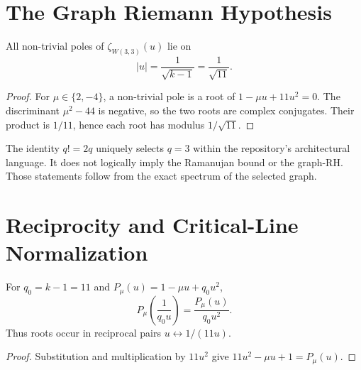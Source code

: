 \section{The Graph Riemann Hypothesis}
\label{sec:grh_theorem}

\begin{theorem}
\label{thm:grh}
All non-trivial poles of $\zeta_{W(3,3)}(u)$ lie on
\begin{equation}
  |u|=\frac{1}{\sqrt{k-1}}=\frac{1}{\sqrt{11}}.
  \label{eq:grh_circle}
\end{equation}
\end{theorem}

\begin{proof}
For $\mu\in\{2,-4\}$, a non-trivial pole is a root of
$1-\mu u+11u^2=0$.  The discriminant $\mu^2-44$ is negative, so the two
roots are complex conjugates.  Their product is $1/11$, hence each root
has modulus $1/\sqrt{11}$.
\end{proof}

\begin{remark}[Role of the selector $q!=2q$]
The identity $q!=2q$ uniquely selects $q=3$ within the repository's
architectural language.  It does not logically imply the Ramanujan bound
or the graph-RH.  Those statements follow from the exact spectrum of the
selected graph.
\end{remark}

\section{Reciprocity and Critical-Line Normalization}
\label{sec:functional}

\begin{proposition}
For $q_0=k-1=11$ and
$P_\mu(u)=1-\mu u+q_0u^2$,
\begin{equation}
  P_\mu\!\left(\frac{1}{q_0u}\right)
  =\frac{P_\mu(u)}{q_0u^2}.
\end{equation}
Thus roots occur in reciprocal pairs $u\leftrightarrow1/(11u)$.
\end{proposition}

\begin{proof}
Substitution and multiplication by $11u^2$ give
$11u^2-\mu u+1=P_\mu(u)$.
\end{proof}

